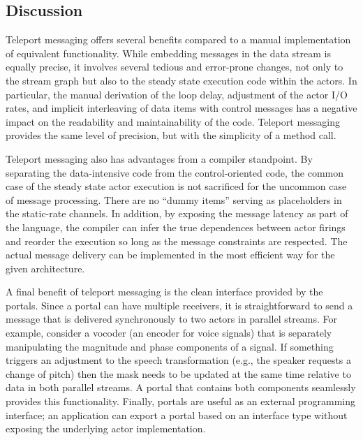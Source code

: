 %

\clearpage
\noindent
%


\subsection{Discussion}

Teleport messaging offers several benefits compared to a manual
implementation of equivalent functionality.  While embedding messages
in the data stream is equally precise, it involves several tedious
and error-prone changes, not only to the stream graph but also to the
steady state execution code within the actors.  In particular, the
manual derivation of the loop delay, adjustment of the actor I/O
rates, and implicit interleaving of data items with control messages
has a negative impact on the readability and maintainability of the
code.  Teleport messaging provides the same level of precision, but
with the simplicity of a method call.

Teleport messaging also has advantages from a compiler standpoint.  By
separating the data-intensive code from the control-oriented code, the
common case of the steady state actor execution is not sacrificed for
the uncommon case of message processing.  There are no ``dummy items''
serving as placeholders in the static-rate channels.  In addition, by
exposing the message latency as part of the language, the compiler can
infer the true dependences between actor firings and reorder the
execution so long as the message constraints are respected.  The
actual message delivery can be implemented in the most efficient way
for the given architecture.

A final benefit of teleport messaging is the clean interface provided
by the portals.  Since a portal can have multiple receivers, it is
straightforward to send a message that is delivered synchronously to
two actors in parallel streams.  For example, consider a vocoder (an
encoder for voice signals) that is separately manipulating the
magnitude and phase components of a signal.  If something triggers an
adjustment to the speech transformation (e.g., the speaker
requests a change of pitch) then the mask needs to be updated at the
same time relative to data in both parallel streams.  A portal that
contains both components seamlessly provides this functionality.
Finally, portals are useful as an external programming interface; an
application can export a portal based on an interface type without
exposing the underlying actor implementation.


